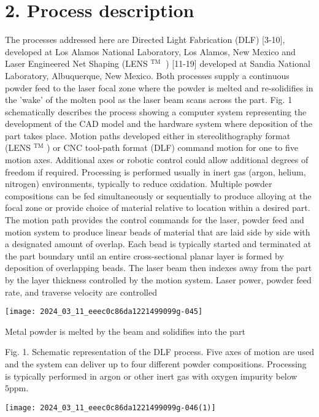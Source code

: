 \documentclass[10pt]{article}
\begin{document}
\section*{2. Process description}
The processes addressed here are Directed Light Fabrication (DLF) [3-10], developed at Los Alamos National Laboratory, Los Alamos, New Mexico and Laser Engineered Net Shaping (LENS ${ }^{\text {TM }}$ ) [11-19] developed at Sandia National Laboratory, Albuquerque, New Mexico. Both processes supply a continuous powder feed to the laser focal zone where the powder is melted and re-solidifies in the 'wake' of the molten pool as the laser beam scans across the part. Fig. 1 schematically describes the process showing a computer system representing the development of the CAD model and the hardware system where deposition of the part takes place. Motion paths developed either in stereolithography format (LENS ${ }^{\mathrm{TM}}$ ) or CNC tool-path format (DLF) command motion for one to five motion axes. Additional axes or robotic control could allow additional degrees of freedom if required. Processing is performed usually in inert gas (argon, helium, nitrogen) environments, typically to reduce oxidation. Multiple powder compositions can be fed simultaneously or sequentially to produce alloying at the focal zone or provide choice of material relative to location within a desired part. The motion path provides the control commands for the laser, powder feed and motion system to produce linear beads of material that are laid side by side with a designated amount of overlap. Each bead is typically started and terminated at the part boundary until an entire cross-sectional planar layer is formed by deposition of overlapping beads. The laser beam then indexes away from the part by the layer thickness controlled by the motion system. Laser power, powder feed rate, and traverse velocity are controlled

\begin{center}
\texttt{[image: 2024\_03\_11\_eeec0c86da1221499099g-045]}
\end{center}

Metal powder is melted by the beam and solidifies into the part

Fig. 1. Schematic representation of the DLF process. Five axes of motion are used and the system can deliver up to four different powder compositions. Processing is typically performed in argon or other inert gas with oxygen impurity below $5 \mathrm{ppm}$.

\begin{center}
\texttt{[image: 2024\_03\_11\_eeec0c86da1221499099g-046(1)]}
\end{center}
\end{document}
